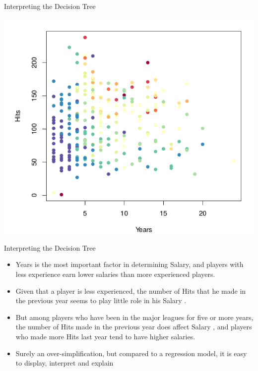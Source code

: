 \documentclass{beamer}
\begin{document}
\begin{frame}{Interpreting the Decision Tree}
    \begin{center}
        \includegraphics[scale=0.3]{baseballSal1.png}
    \end{center}
\end{frame}
\begin{frame}{Interpreting the Decision Tree}
    \begin{itemize}
        \item Years is the most important factor in determining Salary, and players with less experience earn lower salaries than more experienced players.
        \item Given that a player is less experienced, the number of Hits that he made in the previous year seems to play little role in his Salary .
        \item But among players who have been in the major leagues for five or more years, the number of Hits made in the previous year does affect Salary , and players who made more Hits last year tend to have higher salaries.
        \item Surely an over-simplification, but compared to a regression model, it is easy to display, interpret and explain
    \end{itemize}
\end{frame}
\end{document}
